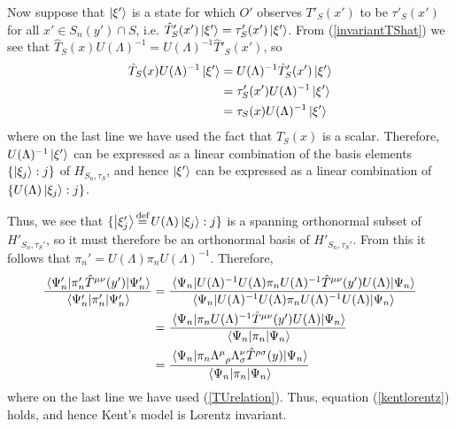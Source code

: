 Now suppose that $\ket{\xi'}$ is a state for which $O'$ observes $T'_S(x')$ to be $\tau'_S(x')$ for all $x'\in S_n(y')\cap S$, i.e.  $\hat{T}_S'(x')\ket{\xi'}=\tau_S'(x')\ket{\xi'}$. From (\ref{invariantTShat}) we see that  $\hat{T}_S(x)U(\Lambda)^{-1}=U(\Lambda)^{-1}\hat{T}'_S(x')$, so
\begin{equation}\label{TSUxi}
\begin{split}
\hat{T}_S(x)U(\Lambda)^{-1}\ket{\xi'}&= U(\Lambda)^{-1} \hat{T}_S'(x')\ket{\xi'}\\
&=\tau_S'(x')U(\Lambda)^{-1}\ket{\xi'}\\
&=\tau_S(x)U(\Lambda)^{-1}\ket{\xi'}
\end{split}
\end{equation}
where on the last line we have used the fact that $T_S(x)$ is a scalar. Therefore, $U(\Lambda)^{-1}\ket{\xi'}$ can be expressed as a linear combination of the basis elements $\{\ket{\xi_j}:j\}$ of $H_{S_n,\tau_S}$, and hence  $\ket{\xi'}$  can be expressed as a linear combination of $\{U(\Lambda)\ket{\xi_j}:j\}$. 




Thus, we see that $\{\ket{\xi_j'}\myeq U(\Lambda)\ket{\xi_j}:j\}$ is a spanning orthonormal subset of $H'_{S_n,\tau_S'}$, so it must therefore be an orthonormal basis of $H'_{S_n,\tau_S'}$. From this it follows that $\pi_n'=U(\Lambda)\pi_nU(\Lambda)^{-1}$. Therefore, 
\begin{equation}\label{kentlorentz2}
\begin{split}
\frac{\ev{\pi_n'\hat{T}^{\mu\nu}(y')}{\Psi_n'}}{\ev{\pi_n'}{\Psi_n'}}&=\frac{\ev{U(\Lambda)^{-1}U(\Lambda)\pi_nU(\Lambda)^{-1}\hat{T}^{\mu\nu}(y')U(\Lambda)}{\Psi_n}}{\ev{U(\Lambda)^{-1}U(\Lambda)\pi_n U(\Lambda)^{-1}U(\Lambda)}{\Psi_n}}\\
&=\frac{\ev{\pi_nU(\Lambda)^{-1}\hat{T}^{\mu\nu}(y')U(\Lambda)}{\Psi_n}}{\ev{\pi_n}{\Psi_n}}\\
&=\frac{\ev{\pi_n\Lambda\indices{^\mu_\rho}\Lambda{^\nu_\sigma}\hat{T}^{\rho\sigma}(y)}{\Psi_n}}{\ev{\pi_n }{\Psi_n}}
\end{split}
\end{equation}
where on the last line we have used (\ref{TUrelation}). Thus, equation (\ref{kentlorentz}) holds, and hence Kent's model is Lorentz invariant.

